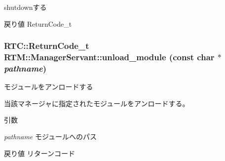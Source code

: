 shutdownする 

\begin{DoxyReturn}{戻り値}
ReturnCode\_\-t 
\end{DoxyReturn}
\subsubsection[{unload\_\-module}]{\setlength{\rightskip}{0pt plus 5cm}RTC::ReturnCode\_\-t RTM::ManagerServant::unload\_\-module (const char $\ast$ {\em pathname})}\label{classRTM_1_1ManagerServant_acf76f20459885fbb6a83f607bf9cff35}


モジュールをアンロードする 

当該マネージャに指定されたモジュールをアンロードする。


\begin{DoxyParams}{引数}
\item[{\em pathname}]モジュールへのパス \end{DoxyParams}
\begin{DoxyReturn}{戻り値}
リターンコード 
\end{DoxyReturn}
